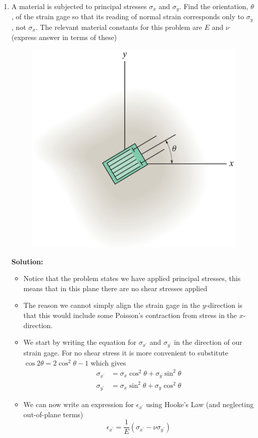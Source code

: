 \documentclass[12pt, oneside]{article}
\begin{document}
\begin{enumerate}
	\item %
		A material is subjected to principal stresses $\sigma_x$ and $\sigma_y$.
		Find the orientation, $\theta$, of the strain gage so that its reading of normal strain corresponds only to $\sigma_y$, not $\sigma_x$.
		The relevant material constants for this problem are $E$ and $\nu$ (express answer in terms of these)
		\begin{figure}[H]
			\centering
			\includegraphics[width=0.6\linewidth]{10-45}
		\end{figure}
			\textbf{Solution:}
			\begin{itemize}
				\item Notice that the problem states we have applied principal stresses, this means that in this plane there are no shear stresses applied
				\item The reason we cannot simply align the strain gage in the $y$-direction is that this would include some Poisson's contraction from stress in the $x$-direction.
				\item We start by writing the equation for $\sigma_{x^\prime}$ and $\sigma_{y^\prime}$ in the direction of our strain gage.
					For no shear stress it is more convenient to substitute $\cos 2\theta = 2\cos^2 \theta -1$ which gives
					\[ \begin{aligned}
						\sigma_{x^\prime} &= \sigma_x \cos^2\theta + \sigma_y \sin^2 \theta\\
						\sigma_{y^\prime} &= \sigma_x \sin^2\theta + \sigma_y \cos^2 \theta
					\end{aligned}\]
				\item We can now write an expression for $\epsilon_{x^\prime}$ using Hooke's Law (and neglecting out-of-plane terms)
					\[ \epsilon_{x^\prime} = \frac{1}{E}( \sigma_{x^\prime} - \nu \sigma_{y^\prime} )\]

\end{itemize}
\end{enumerate}
\end{document}
